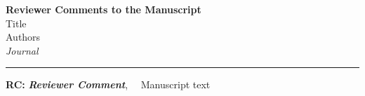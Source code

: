 \providecommand{\lettertitle}{Reviewer Comments to the Manuscript}
\providecommand{\papertitle}{Title}
\providecommand{\authors}{Authors}
\providecommand{\journal}{Journal}
\providecommand{\doi}{--}





{\Large\bf \lettertitle}\\[1em]
{\huge \papertitle}\\[1em]
{\authors}\\
{\it \journal }
\hrule

\hfill {\bfseries \color{gray}RC:} \textbf{\color{gray}\textit{Reviewer Comment}},\(\quad\) \vrule width 3pt \hspace{5pt} {\selectfont Manuscript text}

\renewcommand\thesubsection{Q\arabic{section}.\arabic{subsection}}